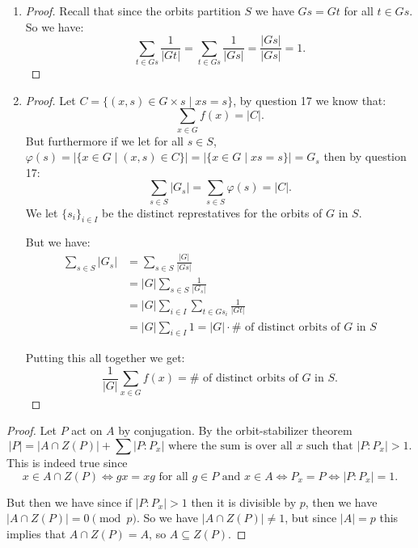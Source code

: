 \begin{exercise}
    \begin{enumerate}[label = (\alph*)]
\item 
\begin{proof}
    Recall that since the orbits partition $S$ we have $Gs = Gt$ for all $t\in Gs$. So we have:  \[
\sum_{t\in Gs}\frac{1}{|Gt|} = \sum_{t\in Gs}\frac{1}{|Gs|} = \frac{|Gs|}{|Gs|} = 1
.\]
\end{proof}

   
\item 
    \begin{proof}
    Let $C = \{(x,s)\in G\times s \mid xs = s\}$, by question 17 we know that: \[
    \sum_{x\in G}f(x) = |C|
.\]
But furthermore if we let for all $s\in S$, $\varphi(s) = |\{x\in G\mid (x,s)\in C\}| = |\{x\in G\mid xs=s\}| = G_s$ then by question 17:
\[
\sum_{s\in S} |G_s| = \sum_{s\in S}\varphi(s) = |C|
.\]
We let $\{s_i\}_{i\in I}$ be the distinct represtatives for the orbits of $G$ in $S$.

But we have: \begin{align*}
\sum_{s\in S}|G_s| &= \sum_{s\in S}\frac{|G|}{|Gs|}\\
&= |G|\sum_{s\in S}\frac{1}{|G_s|}\\
&=|G|\sum_{i\in I}\sum_{t\in Gs_i}\frac{1}{|Gt|}\\
&=|G|\sum_{i\in I}1 = |G|\cdot \#\text{ of distinct orbits of } G\text{ in }S
\end{align*}


Putting this all together we get: \[
    \frac{1}{|G|}\sum_{x\in G}f(x) = \#\text{ of distinct orbits of } G\text{ in }S
.\]
    \end{proof}
\end{enumerate}
   
\end{exercise}
\begin{exercise}
\begin{proof}
    Let $P$ act on $A$ by conjugation. By the orbit-stabilizer theorem \[
    |P| = |A\cap Z(P)| + \sum |P\colon P_x| \text{ where the sum is over all }x\text{ such that }|P\colon P_x|>1
.\]
This is indeed true since \[
    x\in A\cap Z(P) \iff gx = xg \text{ for all }g\in P \text{ and }x\in A \iff P_x = P \iff |P\colon P_x| = 1
.\]

But then we have since if $|P\colon P_x|>1$ then it is divisible by $p$, then we have $|A\cap Z(P)| = 0\pmod{p}$.
So we have $|A\cap Z(P)| \neq 1$, but since $|A| = p$ this implies that  $A\cap Z(P) = A$, so  $A\subseteq Z(P)$.

\end{proof}

\end{exercise}
